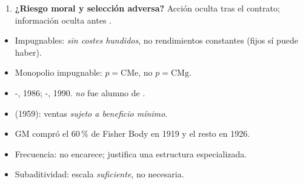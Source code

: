 \documentclass{article}
\begin{document}
\begin{columnas}
\begin{enumerate}
\item \textbf{¿Riesgo moral y selección adversa?} Acción oculta tras el contrato; información oculta antes .
\end{enumerate}
\begin{trampa}
\begin{itemize}
\item Impugnables: \emph{sin costes hundidos}, no rendimientos constantes (fijos sí puede haber).
\item Monopolio impugnable: $p=\mathrm{CMe}$, no $p=\mathrm{CMg}$.
\item {}-, 1986; -, 1990.  \emph{no} fue alumno de .
\item {} (1959): ventas \emph{sujeto a beneficio mínimo}.
\item GM compró el 60\,\% de Fisher Body en 1919 y el resto en 1926.
\item Frecuencia: no encarece; justifica una estructura especializada.
\item Subaditividad: escala \emph{suficiente}, no necesaria.
\end{itemize}
\end{trampa}

\end{columnas}
\end{document}
